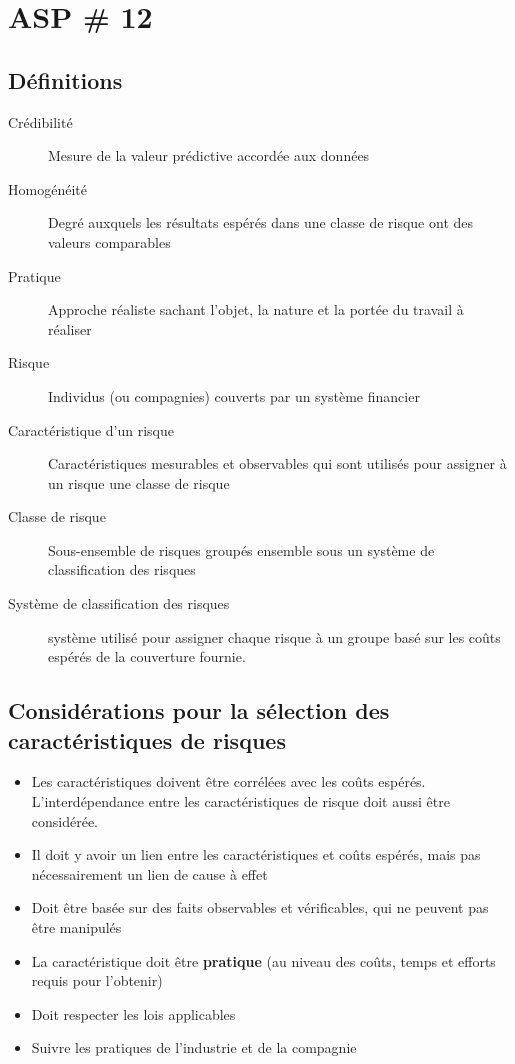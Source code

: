 \section{ASP \# 12}
\subsection{Définitions}
\begin{description}
\item[Crédibilité] Mesure de la valeur prédictive accordée aux données
\item[Homogénéité] Degré auxquels les résultats espérés dans une classe de risque ont des valeurs comparables
\item[Pratique] Approche réaliste sachant l'objet, la nature et la portée du travail à réaliser
\item[Risque] Individus (ou compagnies) couverts par un système financier
\item[Caractéristique d'un risque] Caractéristiques mesurables et observables qui sont utilisés pour assigner à un risque une classe de risque
\item[Classe de risque] Sous-ensemble de risques groupés ensemble sous un système de classification des risques
\item[Système de classification des risques] système utilisé pour assigner chaque risque à un groupe basé sur les coûts espérés de la couverture fournie.
\end{description}

\subsection{Considérations pour la sélection des caractéristiques de risques}
\begin{itemize}
\item Les caractéristiques doivent être corrélées avec les coûts espérés. L'interdépendance entre les caractéristiques de risque doit aussi être considérée.
\item Il doit y avoir un lien entre les caractéristiques et coûts espérés, mais pas nécessairement un lien de cause à effet
\item Doit être basée sur des faits observables et vérificables, qui ne peuvent pas être manipulés
\item La caractéristique doit être \textbf{pratique} (au niveau des coûts,  temps et efforts requis pour l'obtenir)
\item Doit respecter les lois applicables
\item Suivre les pratiques de l'industrie et de la compagnie
\end{itemize}

